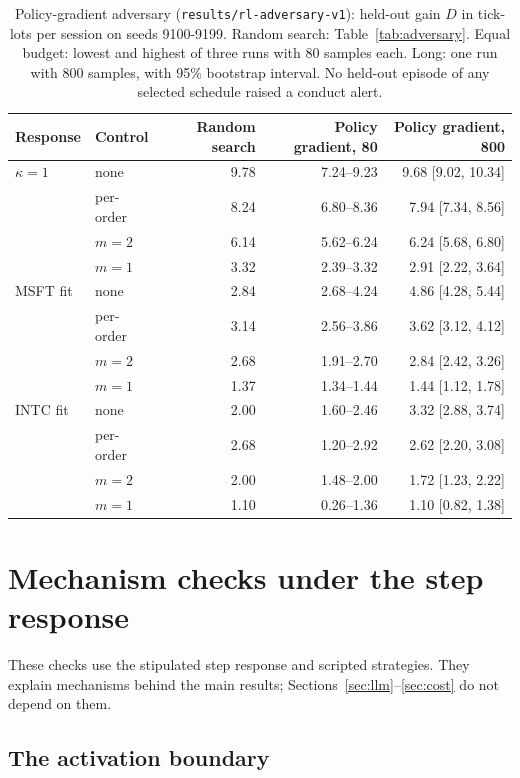 \documentclass{article}
\begin{document}
\begin{table}[t]
\centering
\caption{Policy-gradient adversary (\texttt{results/rl-adversary-v1}): held-out gain $D$ in tick-lots per session on seeds 9100-9199. Random search: Table~\ref{tab:adversary}. Equal budget: lowest and highest of three runs with 80 samples each. Long: one run with 800 samples, with 95\% bootstrap interval. No held-out episode of any selected schedule raised a conduct alert.}\label{tab:rl}
\begin{tabular}{llrrr}
\toprule
Response & Control & Random search & Policy gradient, 80 & Policy gradient, 800 \\
\midrule
$\kappa = 1$ & none & 9.78 & 7.24--9.23 & 9.68 [9.02, 10.34] \\
 & per-order & 8.24 & 6.80--8.36 & 7.94 [7.34, 8.56] \\
 & $m = 2$ & 6.14 & 5.62--6.24 & 6.24 [5.68, 6.80] \\
 & $m = 1$ & 3.32 & 2.39--3.32 & 2.91 [2.22, 3.64] \\
MSFT fit & none & 2.84 & 2.68--4.24 & 4.86 [4.28, 5.44] \\
 & per-order & 3.14 & 2.56--3.86 & 3.62 [3.12, 4.12] \\
 & $m = 2$ & 2.68 & 1.91--2.70 & 2.84 [2.42, 3.26] \\
 & $m = 1$ & 1.37 & 1.34--1.44 & 1.44 [1.12, 1.78] \\
INTC fit & none & 2.00 & 1.60--2.46 & 3.32 [2.88, 3.74] \\
 & per-order & 2.68 & 1.20--2.92 & 2.62 [2.20, 3.08] \\
 & $m = 2$ & 2.00 & 1.48--2.00 & 1.72 [1.23, 2.22] \\
 & $m = 1$ & 1.10 & 0.26--1.36 & 1.10 [0.82, 1.38] \\
\bottomrule
\end{tabular}
\end{table}

\clearpage

\section{Mechanism checks under the step response}\label{sec:appendix}

These checks use the stipulated step response and scripted strategies. They explain mechanisms behind the main results; Sections~\ref{sec:llm}--\ref{sec:cost} do not depend on them.

\subsection{The activation boundary}\label{sec:stepcheck}
\end{document}

